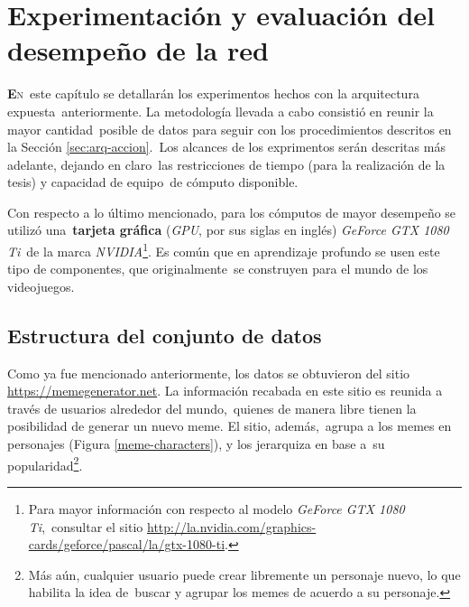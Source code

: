 \chapter{Experimentación y evaluación del desempeño de la red}

\noindent
\lettrine[lines=2, lhang=0.33, loversize=0.25]{\textbf{E}}{n}\
este capítulo se detallarán los experimentos hechos con la arquitectura expuesta\
anteriormente. La metodología llevada a cabo consistió en reunir la mayor cantidad\
posible de datos para seguir con los procedimientos descritos en la Sección \ref{sec:arq-accion}.\
Los alcances de los exprimentos serán descritas más adelante, dejando en claro\
las restricciones de tiempo (para la realización de la tesis) y capacidad de equipo\
de cómputo disponible.\par
Con respecto a lo último mencionado, para los cómputos de mayor desempeño se utilizó una\
\textbf{tarjeta gráfica} (\emph{GPU}, por sus siglas en inglés) \emph{GeForce GTX 1080 Ti}\
de la marca \emph{NVIDIA}\footnote{
  Para mayor información con respecto al modelo \emph{GeForce GTX 1080 Ti},\
  consultar el sitio \url{http://la.nvidia.com/graphics-cards/geforce/pascal/la/gtx-1080-ti}.
}. Es común que en aprendizaje profundo se usen este tipo de componentes, que originalmente\
se construyen para el mundo de los videojuegos.

\section{Estructura del conjunto de datos} \label{sec:dataset}

\noindent
Como ya fue mencionado anteriormente, los datos se obtuvieron del sitio \url{https://memegenerator.net}.
La información recabada en este sitio es reunida a través de usuarios alrededor del mundo,\
quienes de manera libre tienen la posibilidad de generar un nuevo meme. El sitio, además,\
agrupa a los memes en personajes (Figura \ref{meme-characters}), y los jerarquiza en base a\
su popularidad\footnote{
  Más aún, cualquier usuario puede crear libremente un personaje nuevo, lo que habilita la idea de\
  buscar y agrupar los memes de acuerdo a su personaje.
}.\par

